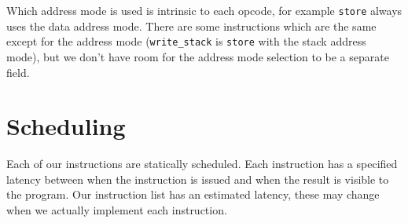 \documentclass{article}
\begin{document}
	Which address mode is used is intrinsic to each opcode, for example \texttt{store} always uses the data address mode.
	There are some instructions which are the same except for the address mode (\texttt{write\_stack} is \texttt{store} with the stack address mode), but we don't have room for the address mode selection to be a separate field.

\section{Scheduling}
	Each of our instructions are statically scheduled.
	Each instruction has a specified latency between when the instruction is issued and when the result is visible to the program.
	Our instruction list has an estimated latency, these may change when we actually implement each instruction.
\end{document}
